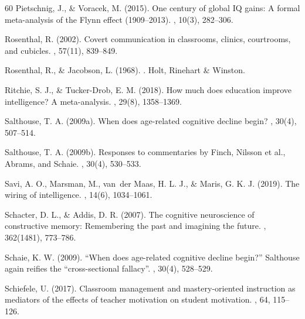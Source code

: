 \documentclass[12pt,a4paper]{article}
\begin{document}
\begin{thebibliography}{60}
Pietschnig, J., \& Voracek, M. (2015).
\newblock One century of global IQ gains: A formal meta-analysis of the Flynn effect (1909--2013).
, 10(3), 282--306.

Rosenthal, R. (2002).
\newblock Covert communication in classrooms, clinics, courtrooms, and cubicles.
, 57(11), 839--849.

Rosenthal, R., \& Jacobson, L. (1968).
.
\newblock Holt, Rinehart \& Winston.

Ritchie, S. J., \& Tucker-Drob, E. M. (2018).
\newblock How much does education improve intelligence? A meta-analysis.
, 29(8), 1358--1369.

Salthouse, T. A. (2009a).
\newblock When does age-related cognitive decline begin?
, 30(4), 507--514.

Salthouse, T. A. (2009b).
\newblock Responses to commentaries by Finch, Nilsson et al., Abrams, and Schaie.
, 30(4), 530--533.

Savi, A. O., Marsman, M., van~der Maas, H. L. J., \& Maris, G. K. J. (2019).
\newblock The wiring of intelligence.
, 14(6), 1034--1061.

Schacter, D. L., \& Addis, D. R. (2007).
\newblock The cognitive neuroscience of constructive memory: Remembering the past and imagining the future.
, 362(1481), 773--786.

Schaie, K. W. (2009).
\newblock ``When does age-related cognitive decline begin?'' Salthouse again reifies the ``cross-sectional fallacy''.
, 30(4), 528--529.

Schiefele, U. (2017).
\newblock Classroom management and mastery-oriented instruction as mediators of the effects of teacher motivation on student motivation.
, 64, 115--126.


\end{thebibliography}
\end{document}
